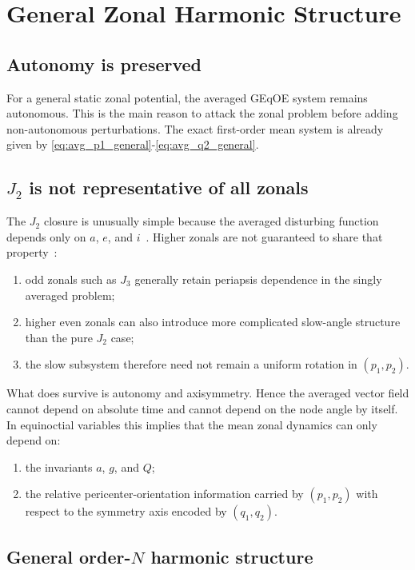 \documentclass[11pt]{article}
\begin{document}
\section{General Zonal Harmonic Structure}
\label{sec:general_zonal}

\subsection{Autonomy is preserved}

For a general static zonal potential, the averaged GEqOE system remains
autonomous. This is the main reason to attack the zonal problem before adding
non-autonomous perturbations. The exact first-order mean system is already given
by \eqref{eq:avg_p1_general}-\eqref{eq:avg_q2_general}.

\subsection{\texorpdfstring{$J_2$}{J2} is not representative of all zonals}

The $J_2$ closure is unusually simple because the averaged disturbing function
depends only on $a$, $e$, and $i$~\cite{brouwer1959}. Higher zonals are not
guaranteed to share that property~\cite{desaedeleer2005,mahajan2019}:
\begin{enumerate}
    \item odd zonals such as $J_3$ generally retain periapsis dependence in the
    singly averaged problem;
    \item higher even zonals can also introduce more complicated slow-angle
    structure than the pure $J_2$ case;
    \item the slow subsystem therefore need not remain a uniform rotation in
    $(p_1,p_2)$.
\end{enumerate}

What does survive is autonomy and axisymmetry. Hence the averaged vector field
cannot depend on absolute time and cannot depend on the node angle by itself.
In equinoctial variables this implies that the mean zonal dynamics can only
depend on:
\begin{enumerate}
    \item the invariants $a$, $g$, and $Q$;
    \item the relative pericenter-orientation information carried by
    $(p_1,p_2)$ with respect to the symmetry axis encoded by $(q_1,q_2)$.
\end{enumerate}

\subsection{General order-\texorpdfstring{$N$}{N} harmonic structure}
\end{document}
